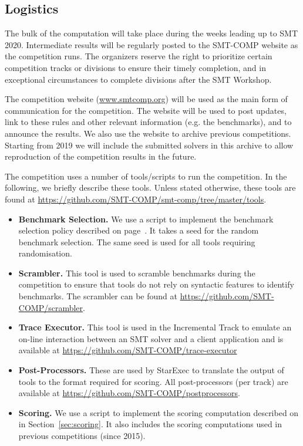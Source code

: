 \documentclass[12pt]{article}
\newcommand{\inctrack}{Incremental Track\xspace}
\begin{document}
\subsection{Logistics}
\label{sec:logistics}

%
The bulk of the computation will take place during the weeks leading
up to SMT 2020.  Intermediate results will be regularly posted to the
SMT-COMP website as the competition runs.
%
The organizers reserve the right to prioritize certain competition
tracks or divisions to ensure their timely completion, and in
exceptional circumstances to complete divisions after the SMT
Workshop.


The competition website (\url{www.smtcomp.org}) will be used as the main form
of communication for the competition. The website will be used to post updates,
link to these rules and other relevant information (e.g. the benchmarks), and
to announce the results. We also use the website to archive previous
competitions. Starting from 2019 we will include the submitted solvers in this
archive to allow reproduction of the competition results in the future.
%

 \label{tools}
The competition uses a number of tools/scripts to run the competition. In the
following, we briefly describe these tools. Unless stated otherwise, these
tools are found at \url{https://github.com/SMT-COMP/smt-comp/tree/master/tools}.
\begin{itemize}
  \item \textbf{Benchmark Selection.} We use a script to implement the
    benchmark selection policy described on page~\pageref{benchmark-selection}.
    It takes a seed for the random benchmark selection. The same seed is used
    for all tools requiring randomisation.
  \item \textbf{Scrambler.} This tool is used to scramble benchmarks during the
    competition to ensure that tools do not rely on syntactic features to
    identify benchmarks. The scrambler can be found at
    \url{https://github.com/SMT-COMP/scrambler}.
  \item \textbf{Trace Executor.} This tool is used in the \inctrack to emulate
    an on-line interaction between an SMT solver and a client application and
    is available at \url{https://github.com/SMT-COMP/trace-executor}
  \item \textbf{Post-Processors.} These are used by StarExec to translate the
    output of tools to the format required for scoring. All post-processors (per
    track) are available at \url{https://github.com/SMT-COMP/postprocessors}.
  \item \textbf{Scoring.} We use a script to implement the scoring computation
    described on in Section~\ref{sec:scoring}. It also includes the scoring
    computations used in previous competitions (since 2015).
\end{itemize}
\end{document}
